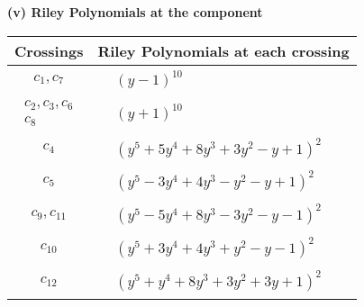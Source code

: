 \documentclass[1p]{elsarticle_modified}
\theoremstyle{definition}
\begin{document}
\newpage\renewcommand{\arraystretch}{1}
\flushleft \textbf{(v) Riley Polynomials at the component}\newline \\
\begin{tabular}{m{50pt}|m{274pt}}
Crossings & \hspace{64pt}Riley Polynomials at each crossing \\
\hline $$\begin{aligned}c_{1},c_{7}\end{aligned}$$&$\begin{aligned}
&(y-1)^{10}
\end{aligned}$\\
\hline $$\begin{aligned}c_{2},c_{3},c_{6}\\c_{8}\end{aligned}$$&$\begin{aligned}
&(y+1)^{10}
\end{aligned}$\\
\hline $$\begin{aligned}c_{4}\end{aligned}$$&$\begin{aligned}
&(y^5+5 y^4+8 y^3+3 y^2- y+1)^2
\end{aligned}$\\
\hline $$\begin{aligned}c_{5}\end{aligned}$$&$\begin{aligned}
&(y^5-3 y^4+4 y^3- y^2- y+1)^2
\end{aligned}$\\
\hline $$\begin{aligned}c_{9},c_{11}\end{aligned}$$&$\begin{aligned}
&(y^5-5 y^4+8 y^3-3 y^2- y-1)^2
\end{aligned}$\\
\hline $$\begin{aligned}c_{10}\end{aligned}$$&$\begin{aligned}
&(y^5+3 y^4+4 y^3+y^2- y-1)^2
\end{aligned}$\\
\hline $$\begin{aligned}c_{12}\end{aligned}$$&$\begin{aligned}
&(y^5+y^4+8 y^3+3 y^2+3 y+1)^2
\end{aligned}$\\
\hline
\end{tabular}\\~\\
\end{document}
